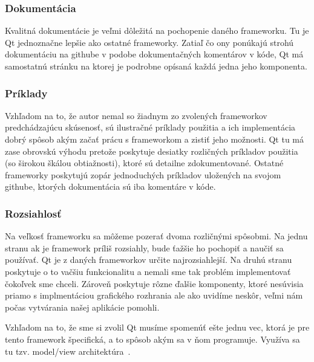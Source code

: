\subsubsection*{Dokumentácia}
Kvalitná dokumentácie je veľmi dôležitá na pochopenie daného frameworku. Tu je Qt jednoznačne lepšie ako ostatné frameworky. Zatiaľ čo ony ponúkajú strohú dokumentáciu na githube v podobe dokumentačných komentárov v kóde, Qt má samostatnú stránku na ktorej je podrobne opísaná každá jedna jeho komponenta.

\subsubsection*{Príklady}
Vzhľadom na to, že autor nemal so žiadnym zo zvolených frameworkov predchádzajúcu skúsenosť, sú ilustračné príklady použitia a ich implementácia dobrý spôsob akým začať prácu s frameworkom a zistiť jeho možnosti. Qt tu má zase obrovskú výhodu pretože poskytuje desiatky rozličných príkladov použitia (so širokou škálou obtiažnosti), ktoré sú detailne zdokumentované. Ostatné frameworky poskytujú zopár jednoduchých príkladov uložených na svojom githube, ktorých dokumentácia sú iba komentáre v kóde.

\subsubsection{Rozsiahlosť}
Na veľkosť frameworku sa môžeme pozerať dvoma rozličnými spôsobmi. Na jednu stranu ak je framework príliš rozsiahly, bude ťažšie ho pochopiť a naučiť sa používať. Qt je z daných frameworkov určite najrozsiahlejší. Na druhú stranu poskytuje o to vačšiu funkcionalitu a nemali sme tak problém implementovať čokoľvek sme chceli. Zároveň poskytuje rôzne ďalšie komponenty, ktoré nesúvisia priamo s implmentáciou grafického rozhrania ale ako uvidíme neskôr, veľmi nám počas vytvárania našej aplikácie pomohli.

Vzhľadom na to, že sme si zvolil Qt musíme spomenúť ešte jednu vec, ktorá je pre tento framework špecifická, a to spôsob akým sa v ňom programuje. Využíva sa tu tzv. model/view architektúra~\cite{qt_model_view}.

